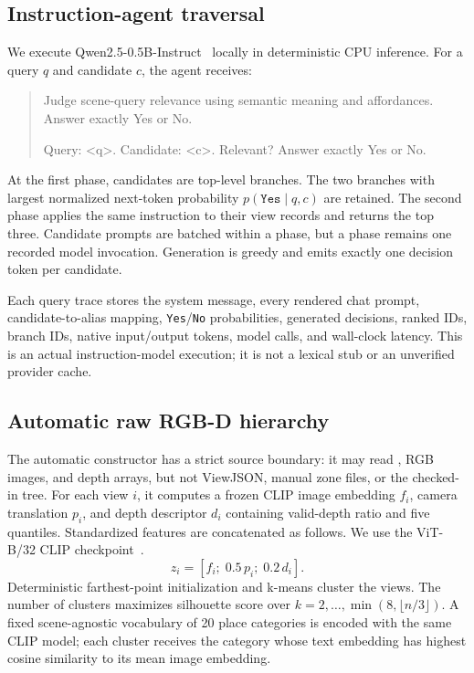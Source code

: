 \documentclass[runningheads]{llncs}
\begin{document}
\subsection{Instruction-agent traversal}
\label{sec:agent}
We execute Qwen2.5-0.5B-Instruct~\cite{qwen25report} locally in deterministic
CPU inference. For a
query $q$ and candidate $c$, the agent receives:
\begin{quote}\small\ttfamily\raggedright
Judge scene-query relevance using semantic meaning and affordances.
Answer exactly Yes or No.\par
Query: <q>. Candidate: <c>. Relevant? Answer exactly Yes or No.
\end{quote}
At the first phase, candidates are top-level branches. The two branches with
largest normalized next-token probability $p(\texttt{Yes}\mid q,c)$ are
retained. The second phase applies the same instruction to their view records
and returns the top three. Candidate prompts are batched within a phase, but a
phase remains one recorded model invocation. Generation is greedy and emits
exactly one decision token per candidate.

Each query trace stores the system message, every rendered chat prompt,
candidate-to-alias mapping, \texttt{Yes}/\texttt{No} probabilities, generated
decisions, ranked IDs, branch IDs, native input/output tokens, model calls, and
wall-clock latency. This is an actual instruction-model execution; it is not a
lexical stub or an unverified provider cache.

\subsection{Automatic raw RGB-D hierarchy}
\label{sec:automatic}
The automatic constructor has a strict source boundary: it may read
, RGB images, and depth arrays, but not ViewJSON,
manual zone files, or the checked-in tree. For each view $i$, it computes a
frozen CLIP image embedding $f_i$, camera translation $p_i$, and depth
descriptor $d_i$ containing valid-depth ratio and five quantiles. Standardized
features are concatenated as follows. We use the ViT-B/32 CLIP
checkpoint~\cite{radford2021clip}.
\begin{equation}
 z_i=[f_i;\;0.5\,p_i;\;0.2\,d_i].
\end{equation}
Deterministic farthest-point initialization and k-means cluster the views.
The number of clusters maximizes silhouette score over
$k=2,\ldots,\min(8,\lfloor n/3\rfloor)$. A fixed scene-agnostic vocabulary of
20 place categories is encoded with the same CLIP model; each cluster receives
the category whose text embedding has highest cosine similarity to its mean
image embedding.
\end{document}
